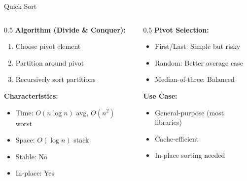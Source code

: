 \documentclass[aspectratio=169,xcolor=dvipsnames]{beamer}
\begin{document}
\begin{frame}{Quick Sort}
  \begin{columns}
    \begin{column}{0.5\textwidth}
      \textbf{Algorithm (Divide \& Conquer):}
      \begin{enumerate}
        \item Choose pivot element
        \item Partition around pivot
        \item Recursively sort partitions
      \end{enumerate}

      \vspace{0.3cm}
      \textbf{Characteristics:}
      \begin{itemize}
        \item Time: $O(n \log n)$ avg, $O(n^2)$ worst
        \item Space: $O(\log n)$ stack
        \item Stable: No
        \item In-place: Yes
      \end{itemize}
    \end{column}

    \begin{column}{0.5\textwidth}
      \textbf{Pivot Selection:}
      \begin{itemize}
        \item First/Last: Simple but risky
        \item Random: Better average case
        \item Median-of-three: Balanced
      \end{itemize}

      \vspace{0.3cm}
      \textbf{Use Case:}
      \begin{itemize}
        \item General-purpose (most libraries)
        \item Cache-efficient
        \item In-place sorting needed
      \end{itemize}
    \end{column}
  \end{columns}
\end{frame}
\end{document}

